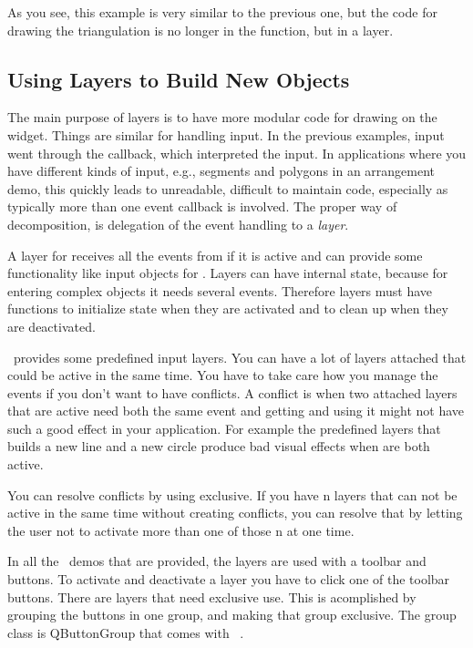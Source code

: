 As you see, this example is very similar to the previous one, but
the code for drawing the triangulation is no longer in the
 function, but in a layer.



\subsection{Using Layers to Build New Objects }
\label{Qt_widget_tools}

The main purpose of layers is to have more modular code for drawing on
the widget. Things are similar for handling input. In the previous
examples, input went through the 
callback, which interpreted the input. In applications where you have
different kinds of input, e.g., segments and polygons in an
arrangement demo, this quickly leads to unreadable, difficult to maintain
code,  especially as typically more than one event callback is
involved. The proper way of decomposition, is delegation
of the event handling to a {\em layer}. 

A layer for  receives all the events from
 if it is active and can provide some functionality
like input objects for . Layers can have internal state,
because for entering complex objects it needs several events. Therefore 
layers must have functions to initialize state when they are activated
and to clean up when they are deactivated.

\cgal\ provides some predefined input layers. You can have a lot of
layers attached that could be active in the same time. You have to
take care how you manage the events if you don't want to have
conflicts. A conflict is when two attached layers that are active need 
both the same event and getting and using it might not have such a
good effect in your application. For example the predefined layers that 
builds a new line and a new circle produce bad visual effects when are 
both active.

You can resolve conflicts by using  exclusive. If you have 
n layers that can not be active in the same time without creating
conflicts, you can resolve that by letting the user not to activate
more than one of those n at one time.

\begin{ccAdvanced}
In all the \cgal\ demos that are provided, the layers are used with a
toolbar and buttons. To activate and deactivate a layer you have to
click one of the toolbar buttons. There are layers that need exclusive 
use. This is acomplished by grouping the buttons in one group, and
making that group exclusive. The group class is QButtonGroup that
comes with \qt\ .
\end{ccAdvanced}

